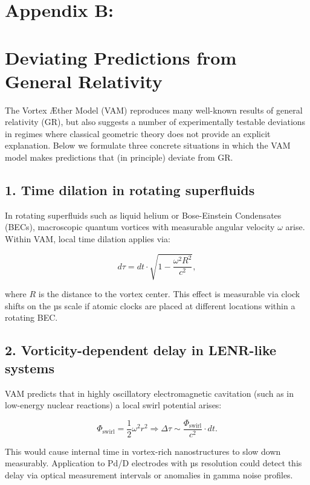 \section*{Appendix B:}
\label{appendix:DeviatingPredictions}
\section*{Deviating Predictions from General Relativity}
The Vortex Æther Model (VAM) reproduces many well-known results of general relativity (GR), but also suggests a number of experimentally testable deviations in regimes where classical geometric theory does not provide an explicit explanation. Below we formulate three concrete situations in which the VAM model makes predictions that (in principle) deviate from GR.

\subsection*{1. Time dilation in rotating superfluids}

In rotating superfluids such as liquid helium or Bose-Einstein Condensates (BECs), macroscopic quantum vortices with measurable angular velocity \( \omega \) arise. Within VAM, local time dilation applies via:

\begin{equation}
d\tau = dt \cdot \sqrt{1 - \frac{\omega^2 R^2}{c^2}},
\end{equation}

where \( R \) is the distance to the vortex center. This effect is measurable via clock shifts on the µs scale if atomic clocks are placed at different locations within a rotating BEC.

\subsection*{2. Vorticity-dependent delay in LENR-like systems}

VAM predicts that in highly oscillatory electromagnetic cavitation (such as in low-energy nuclear reactions) a local swirl potential arises:

\begin{equation}
\Phi_\text{swirl} = \frac{1}{2} \omega^2 r^2 \Rightarrow \Delta \tau \sim \frac{\Phi_\text{swirl}}{c^2} \cdot dt.
\end{equation}

This would cause internal time in vortex-rich nanostructures to slow down measurably. Application to Pd/D electrodes with µs resolution could detect this delay via optical measurement intervals or anomalies in gamma noise profiles.

